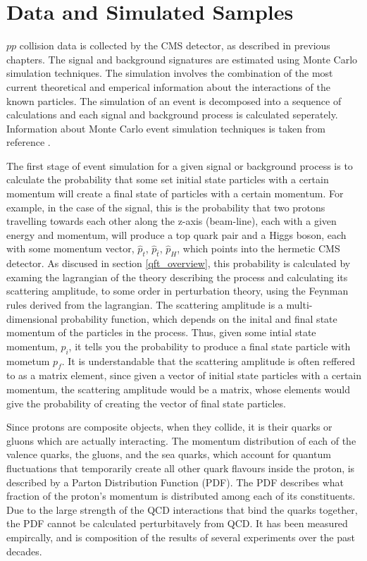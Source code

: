 \section{Data and Simulated Samples}
\label{data_and_mc_overview}

\par $pp$ collision data is collected by the CMS detector, as
described in previous chapters.  The signal and background signatures
are estimated using Monte Carlo simulation techniques.  The simulation
involves the combination of the most current theoretical and emperical
information about the interactions of the known particles.  The
simulation of an event is decomposed into a sequence of calculations and
each signal and background process is calculated seperately.
Information about Monte Carlo event simulation techniques is taken
from reference \cite{Agashe:2014kda}.  

\par The first stage of event simulation for a given signal or
background process is to calculate the probability that some set
initial state particles with a certain momentum will create a final
state of particles with a certain momentum.  For example, in the case of
the \ttH signal, this is the probability that two protons travelling
towards each other along the z-axis (beam-line), each with a given
energy and momentum, will produce a top quark pair and a Higgs boson,
each with some momentum vector, $\hat{p}_{t}$, $\hat{p}_{\bar{t}}$,
$\hat{p}_{H}$, which points into the hermetic CMS detector.  As
discused in section \ref{qft_overview}, this probability is calculated
by examing the lagrangian of the theory describing the process and
calculating its scattering amplitude, to some order in perturbation
theory, using the Feynman rules derived from the lagrangian.  The
scattering amplitude is a multi-dimensional probability function,
which depends on the inital and final state momentum of the particles
in the process.  Thus, given some intial state momentum, $p_{i}$, it tells you
the probability to produce a final state particle with mometum
$p_{f}$.  It is understandable that the scattering amplitude is
often reffered to as a matrix element, since given a vector of initial
state particles with a certain momentum, the scattering amplitude
would be a matrix, whose elements would give the probability of
creating the vector of final state particles.  

\par Since protons are composite objects, when they
collide, it is their quarks or gluons which are actually interacting.
The momentum distribution of each of the valence quarks, the gluons,
and the sea quarks, which account for quantum fluctuations that
temporarily create all other quark flavours inside the proton, is described by
a Parton Distribution Function (PDF).  The PDF describes what fraction
of the proton's momentum is distributed among each of its
constituents.  Due to the large strength of the QCD interactions that
bind the quarks together, the PDF cannot be calculated perturbitavely
from QCD.  It has been measured empircally, and is composition of the
results of several experiments over the past decades.  

